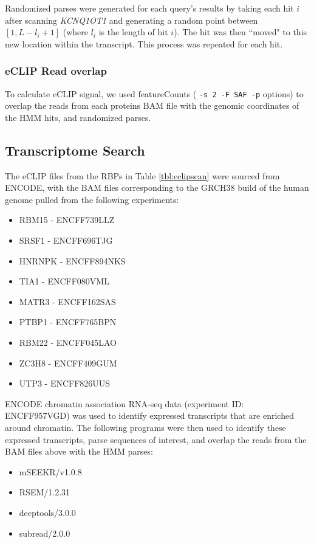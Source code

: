 Randomized parses were generated for each query's results by taking each hit $i$ after scanning \textit{KCNQ1OT1} and generating a random point between $[1,L-l_i+1]$ (where $l_i$ is the length of hit $i$). The hit was then ``moved" to this new location within the transcript. This process was repeated for each hit. 
\subsubsection{eCLIP Read overlap}

To calculate eCLIP signal, we used featureCounts ( \texttt{-s 2 -F SAF -p} options) to overlap the reads from each proteins BAM file with the genomic coordinates of the HMM hits, and randomized parses. 

\subsection{Transcriptome Search}
The eCLIP files from the RBPs in Table \ref{tbl:eclipscan} were sourced from ENCODE, with the BAM files corresponding to the GRCH38 build of the human genome pulled from the following experiments: 

\begin{itemize}
  \item RBM15 - ENCFF739LLZ
  \item SRSF1 - ENCFF696TJG
  \item HNRNPK - ENCFF894NKS
  \item TIA1 - ENCFF080VML
  \item MATR3 - ENCFF162SAS
  \item PTBP1 - ENCFF765BPN
  \item RBM22 - ENCFF045LAO
  \item ZC3H8 - ENCFF409GUM
  \item UTP3 - ENCFF826UUS
\end{itemize}

ENCODE chromatin association RNA-seq data (experiment ID: ENCFF957VGD) was used to identify expressed transcripts that are enriched around chromatin. The following programs were then used to identify these expressed transcripts, parse sequences of interest, and overlap the reads from the BAM files above with the HMM parses: 

\begin{itemize}
   \item mSEEKR/v1.0.8
    \item RSEM/1.2.31
    \item deeptools/3.0.0
    \item  subread/2.0.0
\end{itemize}

